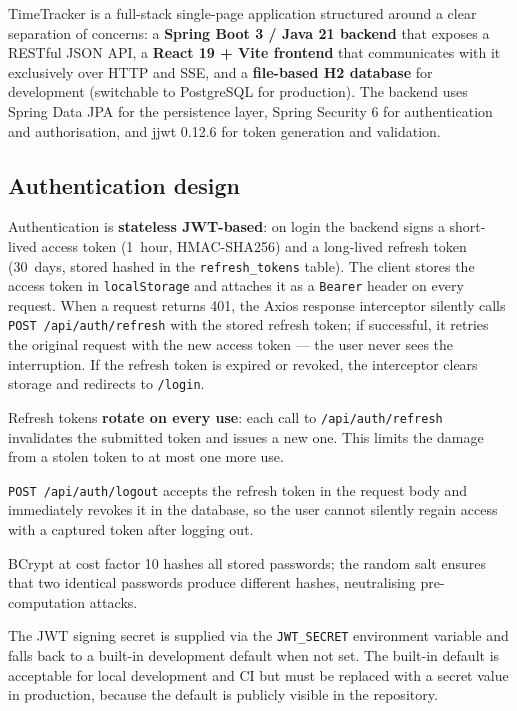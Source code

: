 \documentclass[a4paper, 12pt]{article}
\begin{document}
TimeTracker is a full-stack single-page application structured around a clear separation of
concerns: a \textbf{Spring Boot 3 / Java 21 backend} that exposes a RESTful JSON API, a
\textbf{React 19 + Vite frontend} that communicates with it exclusively over HTTP and SSE,
and a \textbf{file-based H2 database} for development (switchable to PostgreSQL for
production). The backend uses Spring Data JPA for the persistence layer, Spring Security 6
for authentication and authorisation, and jjwt 0.12.6 for token generation and validation.

\subsection{Authentication design}

Authentication is \textbf{stateless JWT-based}: on login the backend signs a short-lived
access token (1~hour, HMAC-SHA256) and a long-lived refresh token (30~days, stored hashed
in the \texttt{refresh\_tokens} table). The client stores the access token in
\texttt{localStorage} and attaches it as a \texttt{Bearer} header on every request. When a
request returns 401, the Axios response interceptor silently calls
\texttt{POST /api/auth/refresh} with the stored refresh token; if successful, it retries the
original request with the new access token --- the user never sees the interruption. If the
refresh token is expired or revoked, the interceptor clears storage and redirects to
\texttt{/login}.

Refresh tokens \textbf{rotate on every use}: each call to \texttt{/api/auth/refresh}
invalidates the submitted token and issues a new one. This limits the damage from a stolen
token to at most one more use.

\texttt{POST /api/auth/logout} accepts the refresh token in the request body and immediately
revokes it in the database, so the user cannot silently regain access with a captured token
after logging out.

BCrypt at cost factor 10 hashes all stored passwords; the random salt ensures that two
identical passwords produce different hashes, neutralising pre-computation attacks.

The JWT signing secret is supplied via the \texttt{JWT\_SECRET} environment variable and
falls back to a built-in development default when not set. The built-in default is acceptable
for local development and CI but must be replaced with a secret value in production, because
the default is publicly visible in the repository.
\end{document}
